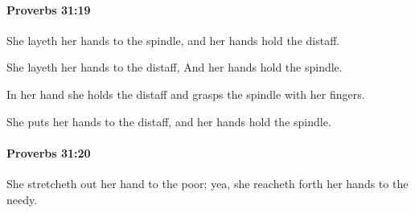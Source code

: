 		\paragraph{Proverbs 31:19} %
			\label{PROVERBS-31-19}

			She layeth her hands to the spindle, and her hands hold the distaff.

			\begin{versebox}
					\item[BHS] 
					\item[ASV] She layeth her hands to the distaff, And her hands hold the spindle.
					\item[NIV] In her hand she holds the distaff and grasps the spindle with her fingers.
					\item[NRSV] She puts her hands to the distaff, and her hands hold the spindle.
			\end{versebox}

		\paragraph{Proverbs 31:20} %
			\label{PROVERBS-31-20}

			She stretcheth out her hand to the poor; yea, she reacheth forth her hands to the needy.

